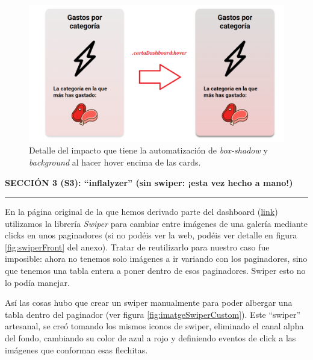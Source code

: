 \documentclass[a4paper,12pt]{report}
\begin{document}
		\FloatBarrier
	\begin{figure}[H]
		\centering
		\caption{Detalle del impacto que tiene la automatización de \textit{box-shadow} y \textit{background} al hacer hover encima de las cards.}
		\label{fig:cardCaracteristicaAbansDespres}
		\includegraphics[width=1\linewidth]{img/cardCaracteristicaAbansDespres.png}
	\end{figure}
	\FloatBarrier
	
	
	
	\noindent \textbf{SECCIÓN 3 (S3): ``inflalyzer'' (sin swiper: ¡esta vez hecho a mano!) }
	\hrule
	\vspace{.5em}
	En la página original de la que hemos derivado parte del dashboard (\href{https://blackcub3s.github.io/proyectoDesarrolloInterfaces/FrontEnd.html}{link}) utilizamos la librería \textit{Swiper} para cambiar entre imágenes de una galería mediante clicks en unos paginadores (si no podéis ver la web, podéis ver detalle en figura \ref{fig:swiperFront} del anexo). Tratar de reutilizarlo para nuestro caso fue imposible: ahora no tenemos solo imágenes a ir variando con los paginadores, sino que tenemos una tabla entera a poner dentro de esos paginadores. Swiper esto no lo podía manejar.
	
	Así las cosas hubo que crear un swiper manualmente para poder albergar una tabla dentro del paginador (ver figura \ref{fig:imatgeSwiperCustom}). Este ``swiper'' artesanal, se creó tomando los mismos iconos de swiper, eliminado el canal alpha del fondo, cambiando su color de azul a rojo y definiendo eventos de click a las imágenes que conforman esas flechitas.
	
\end{document}
